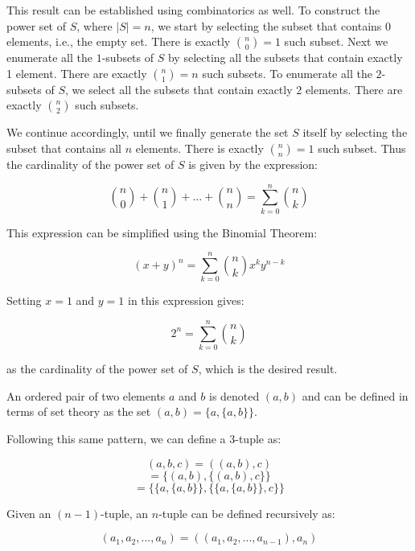 \documentclass[a4paper,12pt]{article}
\begin{document}
\vspace{2mm}
This result can be established using combinatorics as well. To construct the power set of $S$, where $|S| = n$, we start by selecting the subset that contains $0$ elements, i.e., the empty set. There is exactly $\binom{n}{0} = 1$ such subset. Next we enumerate all the $1$-subsets of $S$ by selecting all the subsets that contain exactly 1 element. There are exactly $\binom{n}{1} = n$ such subsets. To enumerate all the $2$-subsets of $S$, we select all the subsets that contain exactly 2 elements. There are exactly $\binom{n}{2}$ such subsets. 

We continue accordingly, until we finally generate the set $S$ itself by selecting the subset that contains all $n$ elements. There is exactly $\binom{n}{n} = 1$ such subset. Thus the cardinality of the power set of $S$ is given by the expression:

\[ \binom{n}{0} + \binom{n}{1} + ... + \binom{n}{n} = \sum_{k=0}^n \binom{n}{k} \]

This expression can be simplified using the Binomial Theorem:

\[ \left(x+y\right)^n = \sum_{k=0}^n \binom{n}{k}x^ky^{n-k} \]

Setting $x=1$ and $y=1$ in this expression gives:

\[ 2^n = \sum_{k=0}^n \binom{n}{k} \]

\noindent
as the cardinality of the power set of $S$, which is the desired result.

\vspace{5mm}

An ordered pair of two elements $a$ and $b$ is denoted $(a,b)$ and can be defined in terms of set theory as the set $(a,b) = \{a, \{a,b\}\}$. 

Following this same pattern, we can define a 3-tuple as:

\[ (a,b,c) = ((a,b),c) \]
\[ = \{ (a,b), \{(a,b), c\}\}\]
\[ = \{ \{a, \{a,b\}\}, \{ \{a, \{ a,b\}\}, c\}\}\]

Given an $(n-1)$-tuple, an $n$-tuple can be defined recursively as:

\[ (a_1, a_2, ..., a_n) = ((a_1, a_2, ..., a_{n-1}),a_n) \]
\end{document}
